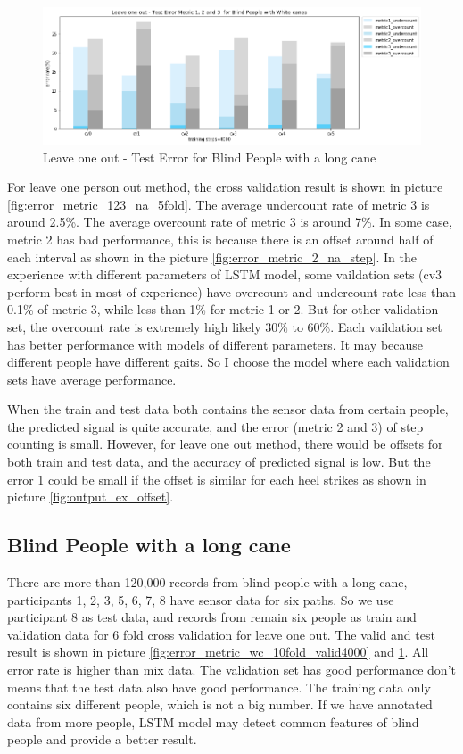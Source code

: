 \documentclass[11pt]{article}
\begin{document}
{\begin{figure}[ht]
\centering
\includegraphics[scale=0.5]{error_metric_wc_10fold_test4000}
\caption{Leave one out - Test Error for Blind People with a long cane}
\label{fig:error_metric_wc_10fold_test4000}
\end{figure}

For leave one person out method, the cross validation result is shown in picture \ref{fig:error_metric_123_na_5fold}.
The average undercount rate of metric 3 is around 2.5\%. The average overcount rate of metric 3 is around 7\%.
 In some case, metric 2 has bad performance, this is because there is an offset around half of each interval as shown in the picture  \ref{fig:error_metric_2_na_step}. 
 In the experience with different parameters of LSTM model,  some vaildation sets (cv3 perform best in most of experience) have overcount and undercount rate less than 0.1\% of metric 3, while less than 1\% for metric 1 or 2. But for other validation set, the overcount rate is extremely high likely 30\% to 60\%. Each vaildation set has better performance with models of different parameters. It may because different people have different gaits. So I choose the model where each validation sets have average performance. 

When the train and test data both contains the sensor data from certain people,  the predicted signal is quite accurate, and the error (metric 2 and 3) of step counting is small. However, for leave one out method, there would be offsets for both train and test data, and the accuracy of predicted signal is low. But the error 1 could be small if the offset is similar for each heel strikes as shown in picture \ref{fig:output_ex_offset}. 

\subsection{Blind People with a long cane}
There are more than 120,000 records from blind people with a long cane, participants 1, 2, 3, 5, 6, 7, 8 have sensor data for six paths. So we use participant 8 as test data, and records from remain six people as train and validation data for 6 fold cross validation for leave one out. The valid and test result is shown in picture \ref{fig:error_metric_wc_10fold_valid4000} and \ref{fig:error_metric_wc_10fold_test4000}. All error rate is higher than mix data. The validation set has good performance don't means that the test data also have good performance.
The training data only contains six different people, which is not a big number. If we have annotated data from more people, LSTM model may detect common features of blind people and provide a better result.

}
\end{document}
